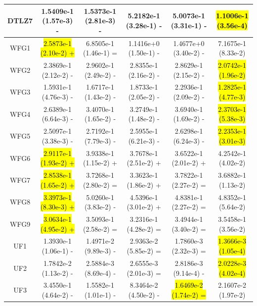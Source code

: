 \documentclass[journal]{IEEEtran}
\begin{document}
\begin{table}[tbp]
\begin{tabular}{cccccc}
        DTLZ7   & 1.5409e-1 (1.57e-3) -      & 1.5373e-1 (2.81e-3) -      & 5.2182e-1 (3.28e-1) - & 5.0073e-1 (3.31e-1) -      & \hl{1.1006e-1 (3.56e-4)}  \\
        \hline
        WFG1    & \hl{2.5873e-1 (2.10e-2) +} & 6.8505e-1 (1.46e-1) =      & 1.1416e+0 (1.50e-1) - & 1.4677e+0 (3.40e-2) -      & 7.1675e-1 (8.33e-2)       \\
        WFG2    & 2.3869e-1 (2.12e-2) -      & 2.9602e-1 (2.49e-2) -      & 2.8355e-1 (2.16e-2) - & 2.8629e-1 (2.15e-2) -      & \hl{2.0742e-1 (1.96e-2)}  \\
        WFG3    & 1.5931e-1 (4.76e-3) -      & 1.6717e-1 (1.43e-2) -      & 1.8733e-1 (2.05e-2) - & 2.2936e-1 (2.09e-2) -      & \hl{1.2825e-1 (4.77e-3)}  \\
        WFG4    & 2.6389e-1 (6.64e-3) -      & 3.4070e-1 (1.65e-2) -      & 3.2749e-1 (1.48e-2) - & 3.6940e-1 (1.69e-2) -      & \hl{2.3703e-1 (5.38e-3)}  \\
        WFG5    & 2.5097e-1 (3.38e-3) -      & 2.7192e-1 (7.79e-3) -      & 2.5955e-1 (6.21e-3) - & 2.6298e-1 (6.24e-3) -      & \hl{2.2353e-1 (3.01e-3)}  \\
        WFG6    & \hl{2.9117e-1 (1.93e-2) +} & 3.9338e-1 (1.15e-2) +      & 3.7678e-1 (2.51e-2) + & 3.6522e-1 (2.01e-2) +      & 4.2542e-1 (4.02e-2)       \\
        WFG7    & \hl{2.8538e-1 (1.65e-2) +} & 3.7268e-1 (2.80e-2) =      & 3.3623e-1 (1.86e-2) + & 3.7822e-1 (2.27e-2) =      & 3.6882e-1 (1.13e-2)       \\
        WFG8    & \hl{3.3973e-1 (8.30e-3) +} & 5.0260e-1 (3.83e-2) -      & 4.5396e-1 (3.01e-2) + & 4.8381e-1 (2.27e-2) =      & 4.8352e-1 (5.64e-2)       \\
        WFG9    & \hl{3.0634e-1 (4.95e-2) +} & 3.5093e-1 (2.58e-2) =      & 3.2316e-1 (4.28e-2) = & 3.4944e-1 (3.40e-2) =      & 3.5458e-1 (3.56e-2)       \\
        \hline
        UF1     & 1.3930e-1 (1.06e-1) -      & 1.4971e-2 (9.89e-3) -      & 2.9363e-2 (5.85e-2) = & 1.7860e-3 (2.32e-3) =      & \hl{1.3666e-3 (1.05e-4)}  \\
        UF2     & 1.7842e-2 (1.13e-2) -      & 2.5884e-3 (8.69e-4) -      & 2.6555e-3 (2.01e-3) = & 2.8186e-3 (9.14e-4) -      & \hl{2.0228e-3 (4.02e-4)}  \\
        UF3     & 3.4550e-1 (4.64e-2) -      & 1.5582e-1 (1.01e-1) -      & 8.3464e-2 (4.50e-2) - & \hl{1.6469e-2 (1.74e-2) =} & 2.1607e-2 (1.97e-2)       \\

\end{tabular}
\end{table}
\end{document}
